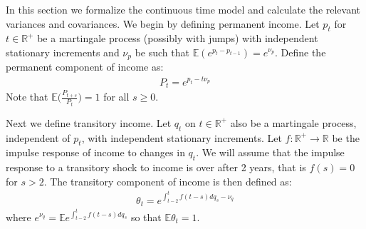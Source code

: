 
In this section we formalize the continuous time model and calculate the relevant variances and covariances. We begin by defining permanent income. Let $p_t$ for $t \in \mathbb{R}^+$ be a martingale process (possibly with jumps) with independent stationary increments and $\nu_p$ be such that $\mathbb{E}(e^{p_t-p_{t-1}})=e^{\nu_p}$. Define the permanent component of income as:
\begin{align*}
P_t = e^{p_t - t\nu_p}
\end{align*}
Note that $\mathbb{E}\Big(\frac{P_{t+s}}{P_t}\Big)=1$ for all $s\geq 0$.

Next we define transitory income. Let $q_t$ on $t \in \mathbb{R}^+$ also be a martingale process, independent of $p_t$, with independent stationary increments. Let $f:\mathbb{R}^+ \rightarrow \mathbb{R}$ be the impulse response of income to changes in $q_t$. We will assume that the impulse response to a transitory shock to income is over after 2 years, that is $f(s)=0$ for $s>2$. The transitory component of income is then defined as:
\begin{align*}
\theta_t =  e^{\int_{t-2}^{t} f(t-s)dq_s -\nu_q} 
\end{align*}
where $e^{\nu_q } = \mathbb{E}e^{\int_{t-2}^{t} f(t-s)dq_s}$ so that $\mathbb{E}\theta_t=1$.

